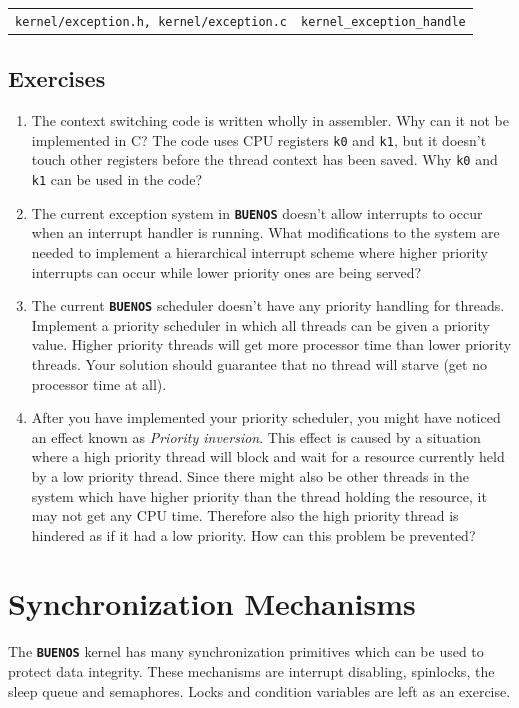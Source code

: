 \documentclass[twoside,a4paper]{report}
\newcommand{\PBS}[1]{\let\temp=\\#1\let\\=\temp}
\newlength{\tablewidth}
\newcommand{\buenos}{\texttt{\textbf{BUENOS}}}
\newenvironment{filelist}[0]{%
\vspace{\baselineskip}%
\begin{center}%
\begin{tabular}{p{4cm}>{\PBS\raggedright}p{\tablewidth-4\tabcolsep-4cm}}%
\hline%
}{%
\end{tabular}%
\end{center}%
}
\newcommand{\file}[2]{\texttt{#1} \vspace{2mm} & #2 \vspace{2mm}\\}
\newenvironment{exercises}[1][\addcontentsline{toc}{section}{Exercises}%
\section*{Exercises}\markright{EXERCISES}]{%
#1%
\begin{enumerate}%
}{%
\end{enumerate}
}
\newcounter{exercisec}[chapter]
\newcommand{\exercise}[1]{%
\item[\stepcounter{exercisec}\arabic{chapter}.\theexercisec{}.] #1%
}
\newcommand{\cexercise}[1]{%
\item[\stepcounter{exercisec}{\huge\Keyboard}\hspace{5mm}\textbf{\arabic{chapter}.\theexercisec{}.}] #1%
}
\begin{document}
\begin{filelist}
\file{kernel/exception.h, kernel/exception.c}
{\texttt{kernel\_exception\_handle}}
\end{filelist}

\begin{exercises}

\exercise{The context switching code is written wholly in assembler.
Why can it not be implemented in C? The code uses CPU registers
\texttt{k0} and \texttt{k1}, but it doesn't touch other registers
before the thread context has been saved. Why \texttt{k0} and \texttt{k1}
can be used in the code?}

\exercise{The current exception system in \buenos{} doesn't allow
interrupts to occur when an interrupt handler is running. What
modifications to the system are needed to implement a hierarchical
interrupt scheme where higher priority interrupts can occur while
lower priority ones are being served?}

\cexercise{The current \buenos{} scheduler doesn't have any priority
handling for threads. Implement a priority scheduler in which all
threads can be given a priority value. Higher priority threads will
get more processor time than lower priority threads. Your solution
should guarantee that no thread will starve (get no processor time at
all).}

\exercise{After you have implemented your priority scheduler, you
might have noticed an effect known as \emph{Priority inversion}. This
effect is caused by a situation where a high priority thread will
block and wait for a resource currently held by a low priority thread.
Since there might also be other threads in the system which have
higher priority than the thread holding the resource, it may not get
any CPU time. Therefore also the high priority thread is hindered as
if it had a low priority. How can this problem be prevented?}



\end{exercises}


\chapter{Synchronization Mechanisms}
\label{sec:sync}

The \buenos{} kernel has many synchronization primitives which can be
used to protect data integrity. These mechanisms are interrupt
disabling, spinlocks, the sleep queue and semaphores. Locks and
condition variables are left as an exercise.
\end{document}
